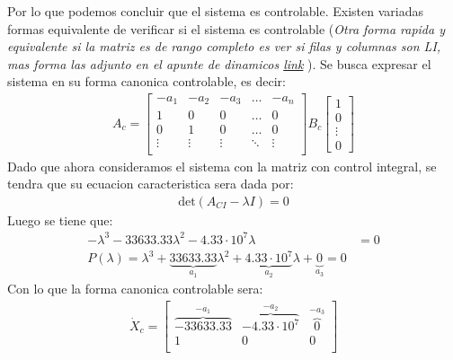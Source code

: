 \documentclass[
  11pt,
  letterpaper,
   addpoints,
   answers
  ]{exam}
\begin{document}
\begin{questions}
\begin{solution}
        Por lo que podemos concluir que el sistema es controlable. Existen variadas formas equivalente de verificar si el sistema es controlable (\textit{Otra forma rapida y equivalente si la matriz es de rango completo es ver si filas y columnas son LI, mas forma las adjunto en el apunte de dinamicos \href{https://www.u-cursos.cl/ingenieria/2024/1/EL3204/1/material_docente/detalle?id=7719473}{link}
        }). Se busca expresar el sistema en su forma canonica controlable, es decir:
        \begin{align}
            A_{c}=
            \begin{bmatrix}
                -a_{1} & -a_{2} & -a_{3} & \dots & -a_{n}\\
                1 & 0 & 0 & \dots & 0\\
                0 & 1 & 0 & \dots & 0\\
                \vdots & \vdots & \vdots & \ddots & \vdots\\
            \end{bmatrix}
            B_{c}
            \begin{bmatrix}
                1\\
                0\\
                \vdots\\
                0
            \end{bmatrix}
        \end{align}
        Dado que ahora consideramos el sistema con la matriz con control integral, se tendra que su ecuacion caracteristica sera dada por:
        \begin{align}
            \text{det}(A_{CI} - \lambda I) = 0
        \end{align}
        Luego se tiene que:
        \begin{align}
        -\lambda^{3} - 33633.33\lambda^{2} - 4.33 \cdot 10^{7} \lambda &= 0\\
        P(\lambda) = \lambda^3 + \underbrace{33633.33}_{a_1}\lambda^2 + \underbrace{4.33 \cdot 10^7}_{a_2}\lambda + \underbrace{0}_{a_3} = 0
        \end{align}
        Con lo que la forma canonica controlable sera:
        \begin{align}
            \dot{X}_c =
            \begin{bmatrix}
            \overbrace{-33633.33}^{-a_1} & \overbrace{-4.33 \cdot 10^7}^{-a_2} & \overbrace{0}^{-a_3} \\
            1 & 0 & 0 \\

\end{bmatrix}
\end{align}
\end{solution}
\end{questions}
\end{document}
